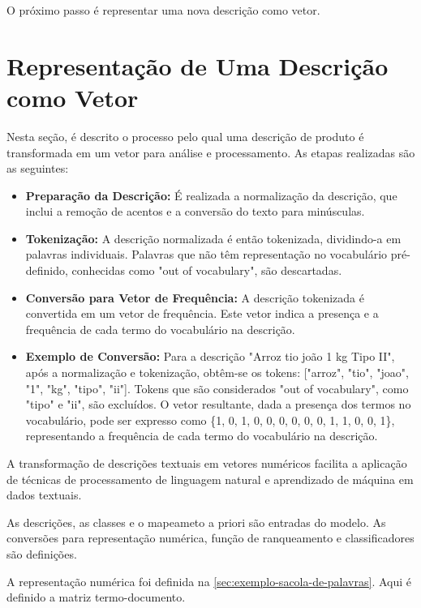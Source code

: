 O próximo passo é representar uma nova descrição como vetor.  

\section{Representação de Uma Descrição como Vetor}
\label{sec:representacao-descricao-vetor}
Nesta seção, é descrito o processo pelo qual uma descrição de produto é transformada em um vetor para análise e processamento. As etapas realizadas são as seguintes:

\begin{itemize}
    \item \textbf{Preparação da Descrição:} É realizada a normalização da descrição, que inclui a remoção de acentos e a conversão do texto para minúsculas.

    \item \textbf{Tokenização:} A descrição normalizada é então tokenizada, dividindo-a em palavras individuais. Palavras que não têm representação no vocabulário pré-definido, conhecidas como "out of vocabulary", são descartadas.

    \item \textbf{Conversão para Vetor de Frequência:} A descrição tokenizada é convertida em um vetor de frequência. Este vetor indica a presença e a frequência de cada termo do vocabulário na descrição.

    \item \textbf{Exemplo de Conversão:} Para a descrição "Arroz tio joão 1 kg Tipo II", após a normalização e tokenização, obtêm-se os tokens: ["arroz", "tio", "joao", "1", "kg", "tipo", "ii"]. Tokens que são considerados "out of vocabulary", como "tipo" e "ii", são excluídos. O vetor resultante, dada a presença dos termos no vocabulário, pode ser expresso como \{1, 0, 1, 0, 0, 0, 0, 0, 0, 1, 1, 0, 0, 1\}, representando a frequência de cada termo do vocabulário na descrição.
\end{itemize}

A transformação de descrições textuais em vetores numéricos facilita a aplicação de técnicas de processamento de linguagem natural e aprendizado de máquina em dados textuais.



As descrições, as classes e o mapeameto a priori são entradas do modelo.  As conversões para representação numérica, função de ranqueamento e classificadores são definições.

A representação numérica foi definida na \ref{sec:exemplo-sacola-de-palavras}.  Aqui é definido a matriz termo-documento.

